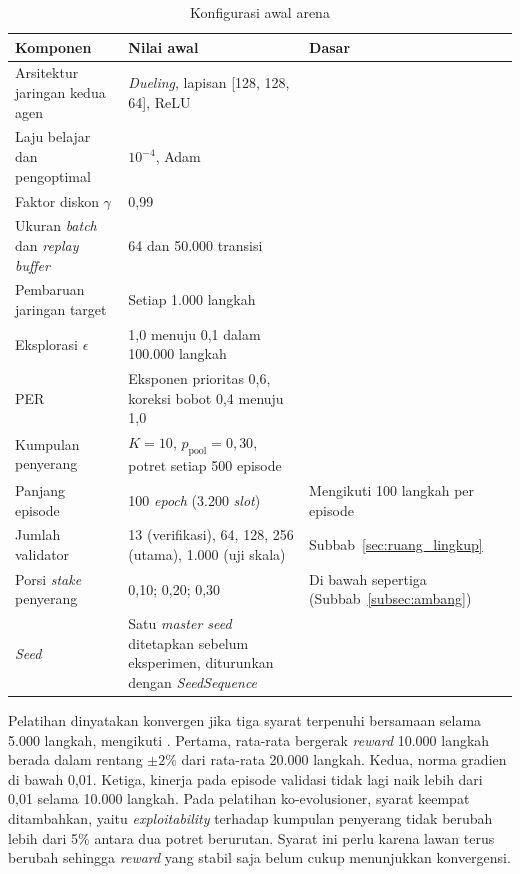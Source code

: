 \begin{table}[htbp]
\centering
\caption{Konfigurasi awal arena}
\label{tab:konfigurasi}
\small
\begin{tabular}{|p{4.6cm}|p{4.2cm}|p{3.4cm}|}
\hline
\textbf{Komponen} & \textbf{Nilai awal} & \textbf{Dasar} \\
\hline
Arsitektur jaringan kedua agen & \textit{Dueling}, lapisan [128, 128, 64], ReLU & \textcite{skowronski2026adaptive} \\
\hline
Laju belajar dan pengoptimal & $10^{-4}$, Adam & \textcite{skowronski2026adaptive} \\
\hline
Faktor diskon $\gamma$ & 0,99 & \textcite{skowronski2026adaptive} \\
\hline
Ukuran \textit{batch} dan \textit{replay buffer} & 64 dan 50.000 transisi & \textcite{skowronski2026adaptive} \\
\hline
Pembaruan jaringan target & Setiap 1.000 langkah & \textcite{skowronski2026adaptive} \\
\hline
Eksplorasi $\epsilon$ & 1,0 menuju 0,1 dalam 100.000 langkah & \textcite{skowronski2026adaptive} \\
\hline
PER & Eksponen prioritas 0,6, koreksi bobot 0,4 menuju 1,0 & \textcite{skowronski2026adaptive} \\
\hline
Kumpulan penyerang & $K = 10$, $p_{\text{pool}} = 0{,}30$, potret setiap 500 episode & \textcite{wushishi2026coadam} \\
\hline
Panjang episode & 100 \textit{epoch} (3.200 \textit{slot}) & Mengikuti 100 langkah per episode \parencite{wushishi2026coadam} \\
\hline
Jumlah validator & 13 (verifikasi), 64, 128, 256 (utama), 1.000 (uji skala) & Subbab~\ref{sec:ruang_lingkup} \\
\hline
Porsi \textit{stake} penyerang & 0,10; 0,20; 0,30 & Di bawah sepertiga (Subbab~\ref{subsec:ambang}) \\
\hline
\textit{Seed} & Satu \textit{master seed} ditetapkan sebelum eksperimen, diturunkan dengan \textit{SeedSequence} & \textcite{skowronski2026adaptive} \\
\hline
\end{tabular}
\end{table}

Pelatihan dinyatakan konvergen jika tiga syarat terpenuhi bersamaan selama 5.000 langkah, mengikuti \textcite{skowronski2026adaptive}. Pertama, rata-rata bergerak \textit{reward} 10.000 langkah berada dalam rentang $\pm 2\%$ dari rata-rata 20.000 langkah. Kedua, norma gradien di bawah 0,01. Ketiga, kinerja pada episode validasi tidak lagi naik lebih dari 0,01 selama 10.000 langkah. Pada pelatihan ko-evolusioner, syarat keempat ditambahkan, yaitu \textit{exploitability} terhadap kumpulan penyerang tidak berubah lebih dari 5\% antara dua potret berurutan. Syarat ini perlu karena lawan terus berubah sehingga \textit{reward} yang stabil saja belum cukup menunjukkan konvergensi.

